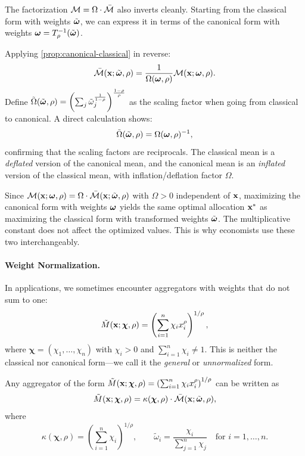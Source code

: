 The factorization $\mathcal{M} = \Omega \cdot \bar{\mathcal{M}}$ also inverts cleanly. Starting from the classical form with weights $\tilde{\boldsymbol{\omega}}$, we can express it in terms of the canonical form with weights $\boldsymbol{\omega} = T_\rho^{-1}(\tilde{\boldsymbol{\omega}})$.

Applying \cref{prop:canonical-classical} in reverse:
\[
\bar{\mathcal{M}}(\mathbf{x}; \tilde{\boldsymbol{\omega}}, \rho) = \frac{1}{\Omega(\boldsymbol{\omega}, \rho)} \mathcal{M}(\mathbf{x}; \boldsymbol{\omega}, \rho).
\]
Define $\tilde{\Omega}(\tilde{\boldsymbol{\omega}}, \rho) = \left( \sum_j \tilde{\omega}_j^{\frac{1}{1-\rho}} \right)^{\frac{1-\rho}{\rho}}$ as the scaling factor when going from classical to canonical. A direct calculation shows:
\[
\tilde{\Omega}(\tilde{\boldsymbol{\omega}}, \rho) = \Omega(\boldsymbol{\omega}, \rho)^{-1},
\]
confirming that the scaling factors are reciprocals. The classical mean is a \emph{deflated} version of the canonical mean, and the canonical mean is an \emph{inflated} version of the classical mean, with inflation/deflation factor $\Omega$.

\begin{calloutimportant}
Since $\mathcal{M}(\mathbf{x}; \boldsymbol{\omega}, \rho) = \Omega \cdot \bar{\mathcal{M}}(\mathbf{x}; \tilde{\boldsymbol{\omega}}, \rho)$ with $\Omega > 0$ independent of $\mathbf{x}$, maximizing the canonical form with weights $\boldsymbol{\omega}$ yields the same optimal allocation $\mathbf{x}^*$ as maximizing the classical form with transformed weights $\tilde{\boldsymbol{\omega}}$. The multiplicative constant does not affect the optimized values. This is why economists use these two interchangeably. 
\end{calloutimportant}

\paragraph{Weight Normalization.}

In applications, we sometimes encounter aggregators with weights that do not sum to one:
\begin{equation}
\tilde{M}(\mathbf{x}; \boldsymbol{\chi}, \rho) = \left( \sum_{i=1}^{n} \chi_i x_i^\rho \right)^{1/\rho},
\end{equation}
where $\boldsymbol{\chi} = (\chi_1, \ldots, \chi_n)$ with $\chi_i > 0$ and $\sum_{i=1}^{n} \chi_i \neq 1$. This is neither the classical nor canonical form---we call it the \emph{general} or \emph{unnormalized} form.

\begin{proposition}[Normalization]
\label{prop:normalization}
Any aggregator of the form $\tilde{M}(\mathbf{x}; \boldsymbol{\chi}, \rho) = \left(\sum_{i=1}^{n} \chi_i x_i^\rho\right)^{1/\rho}$ can be written as
\begin{equation}
\tilde{M}(\mathbf{x}; \boldsymbol{\chi}, \rho) = \kappa(\boldsymbol{\chi}, \rho) \cdot \bar{\mathcal{M}}(\mathbf{x}; \tilde{\boldsymbol{\omega}}, \rho),
\end{equation}
where
\begin{equation}
\kappa(\boldsymbol{\chi}, \rho) = \left( \sum_{i=1}^{n} \chi_i \right)^{1/\rho}, \qquad \tilde{\omega}_i = \frac{\chi_i}{\sum_{j=1}^{n} \chi_j} \quad \text{for } i = 1, \ldots, n.
\end{equation}
\end{proposition}

